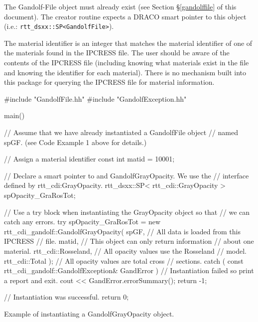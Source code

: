 \documentclass[11pt]{nmemo}
\newenvironment{codeExample}
{\footnotesize 
  \VerbatimEnvironment
  \begin{SaveVerbatim}{\mycode}}%
  {\end{SaveVerbatim}%
  \noindent%
  \parashade[.950]{sharpcorners}{\gdef\outlineboxwidth{.5}%
    \UseVerbatim{\mycode}}\normalsize}
\begin{document}
The Gandolf-File object must already exist (see Section
\S\ref{gandolffile} of this document).  The creator routine expects a
DRACO smart pointer to this object (i.e.: \texttt{rtt\_dsxx::SP<GandolfFile>}).

The material identifier is an integer that matches the material
identifier of one of the materials found in the IPCRESS file.  The
user should be aware of the contents of the IPCRESS file (including
knowing what materials exist in the file and knowing the identifier
for each material).  There is no mechanism built into this package for
querying the IPCRESS file for material information.


\begin{cxxSampleCode}
\begin{codeExample}
#include "GandolfFile.hh"
#include "GandolfException.hh"

main()
{
   // Assume that we have already instantiated a GandolfFile object 
   // named spGF. (see Code Example 1 above for details.)

   // Assign a material identifier
   const int matid = 10001;
        
   // Declare a smart pointer to and GandolfGrayOpacity.  We use the
   // interface defined by rtt_cdi:GrayOpacity.
   rtt_dsxx::SP< rtt_cdi::GrayOpacity > spOpacity_GraRosTot;
        
   // Use a try block when instantiating the GrayOpacity object so that
   // we can catch any errors.
   try
      {
         spOpacity_GraRosTot = new 
            rtt_cdi_gandolf::GandolfGrayOpacity( 
               spGF,   // All data is loaded from this IPCRESS
                       // file.
               matid,  // This object can only return information 
                       // about one material.
               rtt_cdi::Rosseland,     // All opacity values use the Rosseland 
                                       // model.
               rtt_cdi::Total );       // All opacity values are total cross 
                                       // sections.
      }
   catch ( const rtt_cdi_gandolf::GandolfException& GandError )
      {
         // Instantiation failed so print a report and exit.
         cout << GandError.errorSummary();
         return -1;
      }

   // Instantiation was successful.
   return 0;
}
\end{codeExample}
\caption{Example of instantiating a GandolfGrayOpacity object.}
\label{codeExample:gandolfGrayInstantiation}
\end{cxxSampleCode}
\end{document}

